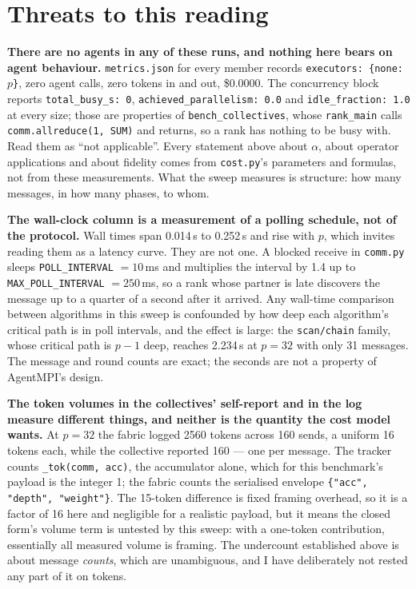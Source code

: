 \documentclass[11pt]{article}
\begin{document}
\section{Threats to this reading}

\textbf{There are no agents in any of these runs, and nothing here bears on agent behaviour.}
\texttt{metrics.json} for every member records \texttt{executors: \{none: $p$\}}, zero agent
calls, zero tokens in and out, \$0.0000. The concurrency block reports
\texttt{total\_busy\_s: 0}, \texttt{achieved\_parallelism: 0.0} and \texttt{idle\_fraction: 1.0}
at every size; those are properties of \texttt{bench\_collectives}, whose \texttt{rank\_main}
calls \texttt{comm.allreduce(1, SUM)} and returns, so a rank has nothing to be busy with. Read
them as ``not applicable''. Every statement above about $\alpha$, about operator applications and
about fidelity comes from \texttt{cost.py}'s parameters and formulas, not from these
measurements. What the sweep measures is structure: how many messages, in how many phases, to
whom.

\textbf{The wall-clock column is a measurement of a polling schedule, not of the protocol.}
Wall times span 0.014\,s to 0.252\,s and rise with $p$, which invites reading them as a latency
curve. They are not one. A blocked receive in \texttt{comm.py} sleeps
\texttt{POLL\_INTERVAL} $=10$\,ms and multiplies the interval by 1.4 up to
\texttt{MAX\_POLL\_INTERVAL} $=250$\,ms, so a rank whose partner is late discovers the message up
to a quarter of a second after it arrived. Any wall-time comparison between algorithms in this
sweep is confounded by how deep each algorithm's critical path is in poll intervals, and the
effect is large: the \texttt{scan/chain} family, whose critical path is $p-1$ deep, reaches
2.234\,s at $p=32$ with only 31 messages. The message and round counts are exact; the seconds are
not a property of AgentMPI's design.

\textbf{The token volumes in the collectives' self-report and in the log measure different
things, and neither is the quantity the cost model wants.} At $p=32$ the fabric logged 2560
tokens across 160 sends, a uniform 16 tokens each, while the collective reported 160 --- one per
message. The tracker counts \texttt{\_tok(comm, acc)}, the accumulator alone, which for this
benchmark's payload is the integer 1; the fabric counts the serialised envelope
\texttt{\{"acc", "depth", "weight"\}}. The 15-token difference is fixed framing overhead, so it
is a factor of 16 here and negligible for a realistic payload, but it means the closed form's
volume term is untested by this sweep: with a one-token contribution, essentially all measured
volume is framing. The undercount established above is about message \emph{counts}, which are
unambiguous, and I have deliberately not rested any part of it on tokens.
\end{document}
